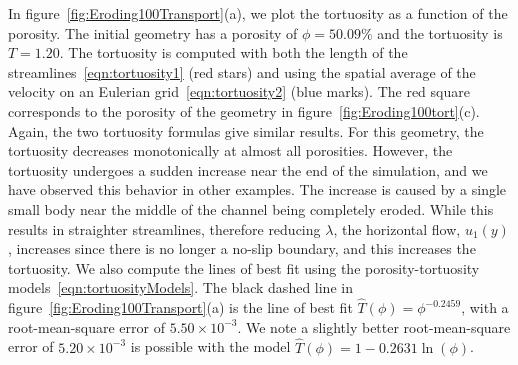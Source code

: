 \documentclass{jfm}
\begin{document}
In figure~\ref{fig:Eroding100Transport}(a), we plot the tortuosity as a
function of the porosity.  The initial geometry has a porosity of $\phi
= 50.09\%$ and the tortuosity is $T = 1.20$.  The tortuosity is computed
with both the length of the streamlines~\eqref{eqn:tortuosity1} (red
stars) and using the spatial average of the velocity on an Eulerian
grid~\eqref{eqn:tortuosity2} (blue marks).  The red square corresponds
to the porosity of the geometry in figure~\ref{fig:Eroding100tort}(c).
Again, the two tortuosity formulas give similar results.  For this
geometry, the tortuosity decreases monotonically at almost all
porosities.  However, the tortuosity undergoes a sudden increase near
the end of the simulation, and we have observed this behavior in other
examples.  The increase is caused by a single small body near the middle
of the channel being completely eroded.  While this results in
straighter streamlines, therefore reducing $\lambda$, the horizontal
flow, $u_1(y)$, increases since there is no longer a no-slip boundary,
and this increases the tortuosity.  We also compute the lines of best
fit using the porosity-tortuosity models~\eqref{eqn:tortuosityModels}.
The black dashed line in figure~\ref{fig:Eroding100Transport}(a) is the
line of best fit $\widehat{T}(\phi) = \phi^{-0.2459}$, with a
root-mean-square error of $5.50 \times 10^{-3}$.  We note a slightly
better root-mean-square error of $5.20 \times 10^{-3}$ is possible with
the model $\widehat{T}(\phi) = 1 - 0.2631 \ln(\phi)$.
\end{document}

